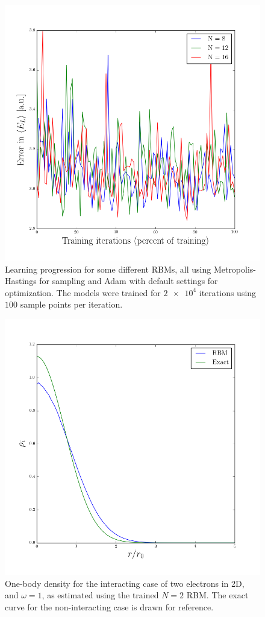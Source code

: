 \documentclass[a4paper, 11pt]{article}
\begin{document}
\begin{figure}[ht]
    \centering
    \includegraphics[width=0.8\linewidth]{../results/learning-N-variants-interacting.png}
    \caption{Learning progression for some different RBMs, all using
    Metropolis-Hastings for sampling and Adam with default settings for
    optimization. The models were trained for $\num{2e4}$ iterations using $100$
    sample points per iteration.}
    \label{fig:N-variants-messy}
\end{figure}
\begin{figure}[ht]
    \centering
    \includegraphics[width=0.8\linewidth]{../results/onebody-interacting-N2.png}
    \caption{One-body density for the interacting case of two electrons in 2D,
    and $\omega = 1$, as estimated using the trained $N=2$ RBM. The exact curve
    for the non-interacting case is drawn for reference. }
    \label{fig:rbm-onebody-inter-single}
\end{figure}
\end{document}
